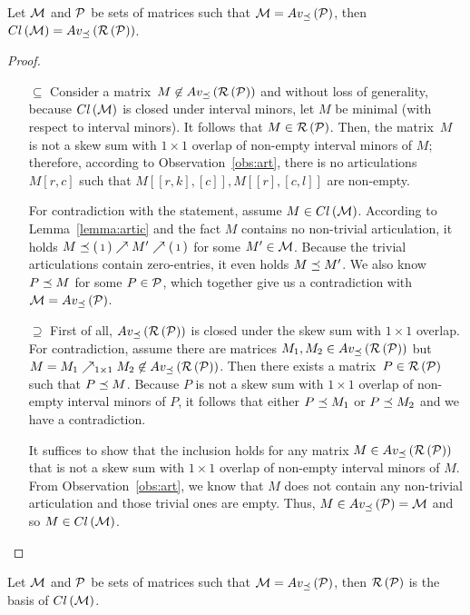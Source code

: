 \begin{thm}
\label{thm:basis}
Let $\mathcal{M}$ and $\mathcal{P}$ be sets of matrices such that $\mathcal{M}=Av_{\preceq}\left(\mathcal{P}\right)$, then $Cl\left(\mathcal{M}\right)=Av_{\preceq}\left(\mathcal{R}\left(\mathcal{P}\right)\right)$.
\end{thm}
\begin{proof}
\begin{itemize}
	\item[$\subseteq$] Consider a matrix~$M\not\in Av_{\preceq}\left(\mathcal{R}\left(\mathcal{P}\right)\right)$ and without loss of generality, because $Cl\left(\mathcal{M}\right)$ is closed under interval minors, let $M$ be minimal (with respect to interval minors). It follows that $M\in\mathcal{R}\left(\mathcal{P}\right)$. Then, the matrix~$M$ is not a skew sum with $1\times1$ overlap of non-empty interval minors of $M$; therefore, according to Observation~\ref{obs:art}, there is no articulations $M[r,c]$ such that $M[[r,k],[c]],M[[r],[c,l]]$ are non-empty.
	
	For contradiction with the statement, assume $M\in Cl\left(\mathcal{M}\right)$. According to Lemma~\ref{lemma:artic} and the fact $M$ contains no non-trivial articulation, it holds $M\preceq\left(\begin{smallmatrix}1\end{smallmatrix}\right)\nearrow M'\nearrow\left(\begin{smallmatrix}1\end{smallmatrix}\right)$ for some $M'\in\mathcal{M}$. Because the trivial articulations contain zero-entries, it even holds $M\preceq M'$. We also know $P\preceq M$ for some $P\in\mathcal{P}$, which together give us a contradiction with $\mathcal{M}=Av_{\preceq}\left(\mathcal{P}\right)$.
	\item[$\supseteq$] First of all, $Av_{\preceq}\left(\mathcal{R}\left(\mathcal{P}\right)\right)$ is closed under the skew sum with $1\times1$ overlap. For contradiction, assume there are matrices $M_1,M_2\in Av_{\preceq}\left(\mathcal{R}\left(\mathcal{P}\right)\right)$ but $M=M_1\nearrow_{1\times1}M_2\not\in Av_{\preceq}\left(\mathcal{R}\left(\mathcal{P}\right)\right)$. Then there exists a matrix~$P\in\mathcal{R}\left(\mathcal{P}\right)$ such that $P\preceq M$. Because $P$ is not a skew sum with $1\times1$ overlap of non-empty interval minors of $P$, it follows that either $P\preceq M_1$ or $P\preceq M_2$ and we have a contradiction.

It suffices to show that the inclusion holds for any matrix $M\in Av_{\preceq}\left(\mathcal{R}\left(\mathcal{P}\right)\right)$ that is not a skew sum with $1\times1$ overlap of non-empty interval minors of $M$. From Observation~\ref{obs:art}, we know that $M$ does not contain any non-trivial articulation and those trivial ones are empty. Thus, $M\in Av_{\preceq}\left(\mathcal{P}\right)=\mathcal{M}$ and so $M\in Cl\left(\mathcal{M}\right)$.
\end{itemize}
\end{proof}

\begin{cor}
Let $\mathcal{M}$ and $\mathcal{P}$ be sets of matrices such that $\mathcal{M}=Av_{\preceq}\left(\mathcal{P}\right)$, then $\mathcal{R}\left(\mathcal{P}\right)$ is the basis of $Cl\left(\mathcal{M}\right)$.
\end{cor}

